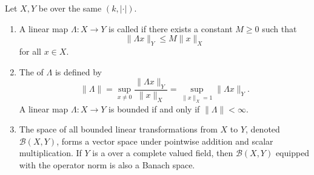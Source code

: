 \begin{definition} \label{definition:bounded_linear_transformation_between_normed_linear_spaces_over_a_valued_field}
Let $X, Y$ be  over the same  $(k, |\cdot|)$.

\begin{enumerate}
    \item A linear map $\Lambda : X \to Y$ is called  if there exists a constant $M \geq 0$ such that
    $$\|\Lambda x\|_Y \leq M \|x\|_X$$
    for all $x \in X$.

    \item The  of $\Lambda$ is defined by
    $$\|\Lambda\| = \sup_{x \neq 0} \frac{\|\Lambda x\|_Y}{\|x\|_X} = \sup_{\|x\|_X = 1} \|\Lambda x\|_Y.$$
    A linear map $\Lambda : X \to Y$ is bounded if and only if $\|\Lambda\| < \infty$.

    \item The space of all bounded linear transformations from $X$ to $Y$, denoted $\mathcal{B}(X,Y)$, forms a vector space under pointwise addition and scalar multiplication. If $Y$ is a  over a complete valued field, then $\mathcal{B}(X,Y)$ equipped with the operator norm is also a Banach space.
\end{enumerate}
\end{definition}
